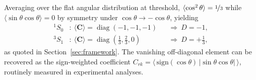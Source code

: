 \documentclass[aps,prd,twocolumn,floatfix,superscriptaddress,longbibliography,10pt]{revtex4-2}
\DeclareMathOperator{\diag}{diag}
\newcommand{\singlet}{\ensuremath{^{1}S_0}\xspace}
\newcommand{\triplet}{\ensuremath{^{3}S_1}\xspace}
\begin{document}
Averaging over the flat angular distribution at threshold,
$\langle\cos^2\theta\rangle = \nicefrac{1}{3}$ while
$\langle\sin\theta\cos\theta\rangle = 0$ by symmetry under
$\cos\theta\to-\cos\theta$, yielding
\begin{align}
  \singlet &: \ \langle\mathbf{C}\rangle = \diag(-1,-1,-1)
      && \Rightarrow \ D = -1, \\
  \triplet &: \ \langle\mathbf{C}\rangle
      = \diag(\tfrac{1}{3},\tfrac{2}{3},0)
      && \Rightarrow \ D = +\tfrac{1}{3},
\end{align}
as quoted in Section~\ref{sec:framework}.
The vanishing off-diagonal element can be recovered as the sign-weighted
coefficient
$C_{rk} = \langle\,\mathrm{sign}(\cos\theta)\,|\sin\theta\cos\theta|\,\rangle$,
routinely measured in experimental analyses.
\end{document}
